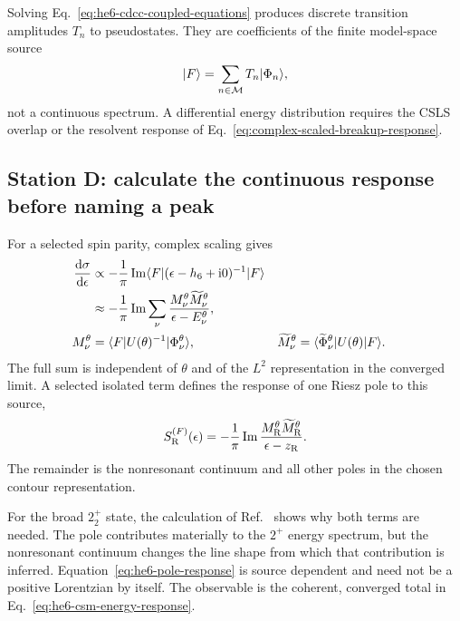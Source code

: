 Solving Eq.~\eqref{eq:he6-cdcc-coupled-equations} produces discrete
transition amplitudes $T_n$ to pseudostates.  They are coefficients of the
finite model-space source
\begin{equation}
  \lvert F \rangle=\sum_{n\in\mathcal M}T_n\lvert \Phi_n \rangle,
  \label{eq:he6-reaction-source}
\end{equation}
not a continuous spectrum.  A differential energy distribution requires the
CSLS overlap or the resolvent response of
Eq.~\eqref{eq:complex-scaled-breakup-response}.

\subsection{Station D: calculate the continuous response before naming a peak}
\label{subsec:he6-continuous-response}

For a selected spin parity, complex scaling gives
\begin{align}
  \frac{\mathrm{d}\sigma}{\mathrm{d}\epsilon}
  &\propto-\frac{1}{\pi}\operatorname{Im}
  \langle F \rvert(\epsilon-h_6+\mathrm{i}0)^{-1}\lvert F \rangle
  \notag\\
  &\approx-\frac{1}{\pi}\operatorname{Im}\sum_\nu
  \frac{M_\nu^\theta\widetilde M_\nu^\theta}
  {\epsilon-E_\nu^\theta},
  \label{eq:he6-csm-energy-response}\\
  M_\nu^\theta
  &=\langle F \rvert U(\theta)^{-1}\lvert \Phi_\nu^\theta \rangle,
  &
  \widetilde M_\nu^\theta
  &=\langle \widetilde\Phi_\nu^\theta \rvert U(\theta)\lvert F \rangle.
  \label{eq:he6-csm-source-residues}
\end{align}
The full sum is independent of $\theta$ and of the $L^2$ representation in
the converged limit.  A selected isolated term defines the response of one
Riesz pole to this source,
\begin{equation}
  S_{\mathrm R}^{(F)}(\epsilon)
  =-\frac{1}{\pi}\operatorname{Im}
  \frac{M_{\mathrm R}^\theta
  \widetilde M_{\mathrm R}^\theta}
  {\epsilon-z_{\mathrm R}}.
  \label{eq:he6-pole-response}
\end{equation}
The remainder is the nonresonant continuum and all other poles in the chosen
contour representation.

For the broad $2_2^+$ state, the calculation of
Ref.~\cite{arXiv:2003.05123} shows why both terms are needed.  The pole
contributes materially to the $2^+$ energy spectrum, but the nonresonant
continuum changes the line shape from which that contribution is inferred.
Equation~\eqref{eq:he6-pole-response} is source dependent and need not be a
positive Lorentzian by itself.  The observable is the coherent, converged
total in Eq.~\eqref{eq:he6-csm-energy-response}.

